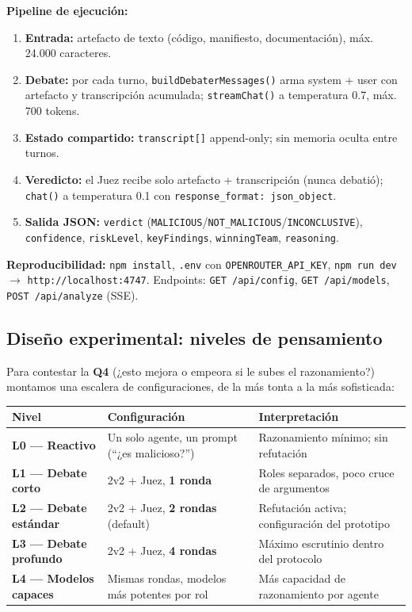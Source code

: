 \documentclass[10pt]{article}
\begin{document}
\textbf{Pipeline de ejecución:}

\begin{enumerate}[leftmargin=*]
  \item \textbf{Entrada:} artefacto de texto (código, manifiesto, documentación), máx.
  24.000 caracteres.
  \item \textbf{Debate:} por cada turno, \texttt{buildDebaterMessages()} arma system +
  user con artefacto y transcripción acumulada; \texttt{streamChat()} a temperatura 0.7,
  máx. 700 tokens.
  \item \textbf{Estado compartido:} \texttt{transcript[]} append-only; sin memoria oculta
  entre turnos.
  \item \textbf{Veredicto:} el Juez recibe solo artefacto + transcripción (nunca
  debatió); \texttt{chat()} a temperatura 0.1 con \texttt{response\_format:
  json\_object}.
  \item \textbf{Salida JSON:} \texttt{verdict}
  (\texttt{MALICIOUS}/\texttt{NOT\_MALICIOUS}/\texttt{INCONCLUSIVE}),
  \texttt{confidence}, \texttt{riskLevel}, \texttt{keyFindings}, \texttt{winningTeam},
  \texttt{reasoning}.
\end{enumerate}

\textbf{Reproducibilidad:} \texttt{npm install}, \texttt{.env} con
\texttt{OPENROUTER\_API\_KEY}, \texttt{npm run dev} $\rightarrow$
\texttt{http://localhost:4747}. Endpoints: \texttt{GET /api/config}, \texttt{GET
/api/models}, \texttt{POST /api/analyze} (SSE).

\subsection{Diseño experimental: niveles de pensamiento}

Para contestar la \textbf{Q4} (¿esto mejora o empeora si le subes el razonamiento?)
montamos una escalera de configuraciones, de la más tonta a la más sofisticada:

\begin{table}[h]
\centering
\small
\begin{tabularx}{\textwidth}{@{}L{3.2cm} L{4.5cm} X@{}}
\toprule
Nivel & Configuración & Interpretación \\
\midrule
\textbf{L0 --- Reactivo} & Un solo agente, un prompt (``¿es malicioso?'') & Razonamiento
mínimo; sin refutación \\
\textbf{L1 --- Debate corto} & 2v2 + Juez, \textbf{1 ronda} & Roles separados, poco
cruce de argumentos \\
\textbf{L2 --- Debate estándar} & 2v2 + Juez, \textbf{2 rondas} (default) & Refutación
activa; configuración del prototipo \\
\textbf{L3 --- Debate profundo} & 2v2 + Juez, \textbf{4 rondas} & Máximo escrutinio
dentro del protocolo \\
\textbf{L4 --- Modelos capaces} & Mismas rondas, modelos más potentes por rol & Más
capacidad de razonamiento por agente \\
\bottomrule
\end{tabularx}
\end{table}
\end{document}
